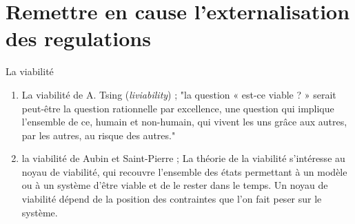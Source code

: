 \documentclass[newPxFont]{beamer}
\begin{document}

\section{Remettre en cause l'externalisation des regulations}

\begin{frame}[c]{La viabilité}
  \vspace{-1cm}
  \begin{enumerate}
    \item La viabilité de A. Tsing (\textit{liviability}) ; "la question « est-ce viable ? » serait peut-être la question rationnelle par excellence, une question qui implique l'ensemble de ce, humain et non-humain, qui vivent les uns grâce aux autres, par les autres, au risque des autres."
    \item la viabilité de Aubin et Saint-Pierre ; La théorie de la viabilité s’intéresse au noyau de viabilité, qui recouvre l’ensemble des états permettant à un modèle ou à un système d’être viable et de le rester dans le temps. Un noyau de viabilité dépend de la position des contraintes que l’on fait peser sur le système.
  \end{enumerate}
\end{frame}
\end{document}
